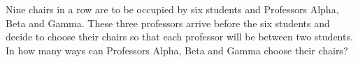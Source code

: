 Nine chairs in a row are to be occupied by six students and Professors Alpha, Beta and Gamma. These three professors arrive before the six students and decide to choose their chairs so that each professor will be between two students. In how many ways can Professors Alpha, Beta and Gamma choose their chairs?
